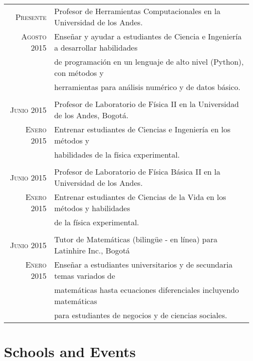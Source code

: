\documentclass[a4paper,10pt]{article} %
\begin{document}
\begin{longtable}{rl}

\textsc{Presente} & Profesor de Herramientas Computacionales en la Universidad de los Andes.\\ 
\textsc{Agosto 2015} & Enseñar y ayudar a estudiantes de Ciencia e Ingeniería a desarrollar habilidades \\& de programación en un lenguaje de alto nivel (Python), con métodos y  \\& herramientas para análisis numérico y de datos básico.  \\
\\

\textsc{Junio 2015} & Profesor de Laboratorio de Física II en la Universidad de los Andes, Bogot\'a.  \\ 
\textsc{Enero 2015} & Entrenar estudiantes de Ciencias e Ingeniería en los métodos y \\& habilidades de la física experimental.\\
\\

\textsc{Junio 2015} & Profesor de Laboratorio de Física Básica II en la Universidad de los Andes. \\ 
\textsc{Enero 2015} & Entrenar estudiantes de Ciencias de la Vida en los métodos y habilidades \\& de la física experimental.\\
\\

\textsc{Junio 2015} & Tutor de Matemáticas (bilingüe - en línea) para Latinhire Inc., Bogot\'a\\ 
\textsc{Enero 2015} & Enseñar a estudiantes universitarios y de secundaria temas variados de \\& matemáticas hasta ecuaciones diferenciales incluyendo matemáticas \\& para estudiantes de negocios y de ciencias sociales.

\end{longtable}


\color{OrangeRed}
\section{Schools and Events}
\color{black}
\end{document}
